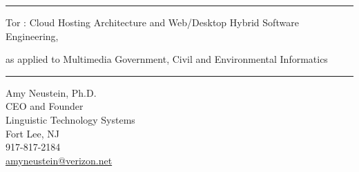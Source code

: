 \documentclass[10.5pt]{article}
\newcommand{\cyanhr}{{\textcolor{cyann!40}{\hrule}}}
\newcommand{\TorqQ}[3]{\hspace*{#1}\raisebox{#2}{\resizebox{!}{#3}{q}}}
\newcommand{\llTorqAthreeR}{Tor\TorqQ{.5pt}{1pt}{5.5pt}%
\hspace*{.5pt}\resizebox{!}{7.5pt}{\textcolor{dsl!70!black}{A3R}}}
\begin{document}
\thispagestyle{firstpage}

\vspace*{83pt}


\begin{center}

{\cyanhr}

\vspace*{8pt}

{\color{red!70!black}\selectfont





{\large{\llTorqAthreeR{}: Cloud Hosting Architecture and Web/Desktop Hybrid Software Engineering,}}

\vspace*{7pt}

{\large{as applied to Multimedia Government, Civil and Environmental Informatics}}



}

{\cyanhr}

\vspace*{38pt}

\hspace{-32pt}Amy Neustein, Ph.D.\\
\hspace{-32pt}CEO and Founder\\
\hspace{-32pt}Linguistic Technology Systems\\
\hspace{-32pt}Fort Lee, NJ\\
\hspace{-32pt}917-817-2184\\
\hspace{-32pt}\href{mailto://amyneustein@verizon.net}{amyneustein@verizon.net}

\end{center}

\vspace*{26pt}
\end{document}
